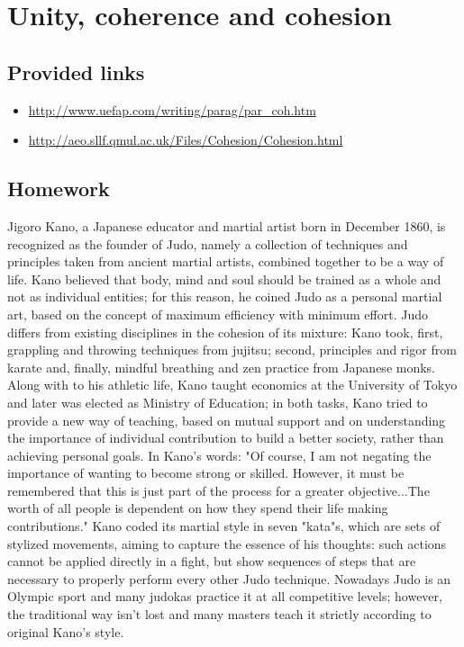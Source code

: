 
\chapter{Unity, coherence and cohesion}

\section{Provided links}

\begin{itemize}
    \item \url{http://www.uefap.com/writing/parag/par_coh.htm}
    \item \url{http://aeo.sllf.qmul.ac.uk/Files/Cohesion/Cohesion.html}
\end{itemize}

\section{Homework}

Jigoro Kano, a Japanese educator and martial artist born in
December 1860, is recognized as the founder of Judo, namely a
collection of techniques and principles taken from ancient martial
artists, combined together to be a way of life.  Kano believed that body,
mind and soul should be trained as a whole and not as individual
entities; for this reason, he coined Judo as a personal martial
art, based on the concept of maximum efficiency with minimum
effort.  Judo differs from existing disciplines in the cohesion of
its mixture: Kano took, first, grappling and throwing techniques
from jujitsu; second, principles and rigor from karate and,
finally, mindful breathing and zen practice from Japanese
monks. Along with to his athletic life, Kano taught economics at
the University of Tokyo and later was elected as Ministry of
Education; in both tasks, Kano tried to provide a new way of
teaching, based on mutual support and on understanding the
importance of individual contribution to build a better society,
rather than achieving personal goals. In Kano's words: "Of
course, I am not negating the importance of wanting to become
strong or skilled. However, it must be remembered that this is
just part of the process for a greater objective...The worth of
all people is dependent on how they spend their life making
contributions."  Kano coded its martial style in seven "kata"s,
which are sets of stylized movements, aiming to capture the essence
of his thoughts: such actions cannot be applied directly in a
fight, but show sequences of steps that are necessary to properly
perform every other Judo technique.  Nowadays Judo is an Olympic
sport and many judokas practice it at all competitive levels;
however, the traditional way isn't lost and many masters teach it
strictly according to original Kano's style.
